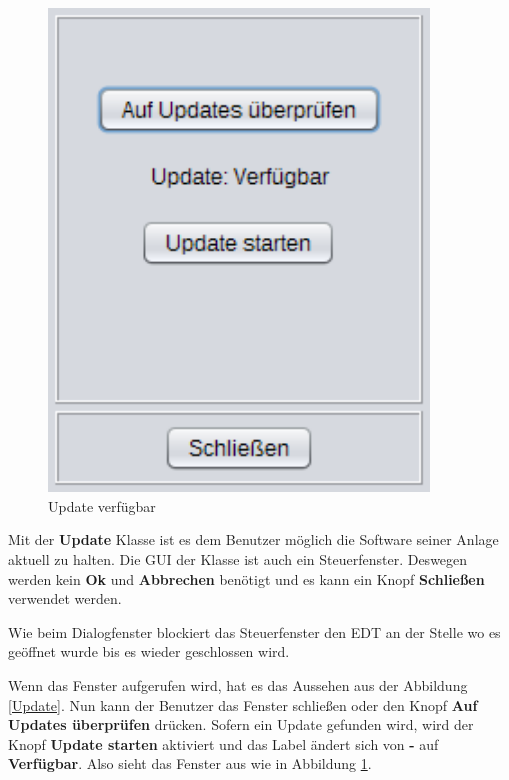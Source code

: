\begin{figure}[H]
\begin{minipage}[hbt]{0.45\textwidth}
    \includegraphics[width=0.9\textwidth]{Bilder/GUI/Update2}
  	\caption{Update verfügbar}
  	\label{Update2}
  \end{minipage}
  \vspace{0pt}
\end{figure}
Mit der \textbf{Update} Klasse ist es dem Benutzer möglich die Software seiner Anlage aktuell zu halten. Die GUI der Klasse ist auch ein Steuerfenster. Deswegen werden kein \textbf{Ok} und \textbf{Abbrechen} benötigt und es kann ein Knopf \textbf{Schließen} verwendet werden.

\vspace{10pt}

Wie beim Dialogfenster blockiert das Steuerfenster den EDT an der Stelle wo es geöffnet wurde bis es wieder geschlossen wird.

\vspace{10pt}

Wenn das Fenster aufgerufen wird, hat es das Aussehen aus der Abbildung \ref{Update}. Nun kann der Benutzer das Fenster schließen oder den Knopf \textbf{Auf Updates überprüfen} drücken. Sofern ein Update gefunden wird, wird der Knopf \textbf{Update starten} aktiviert und das Label ändert sich von \textbf{-} auf \textbf{Verfügbar}. Also sieht das Fenster aus wie in Abbildung \ref{Update2}.

